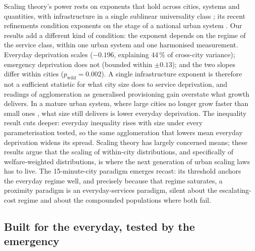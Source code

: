 \documentclass[11pt]{article}
\newcommand{\pw}[1]{$p_{\mathrm{wild}} = #1$}
\begin{document}
Scaling theory's power rests on exponents that hold across cities, systems
and quantities, with infrastructure in a single sublinear universality
class \citep{bettencourt2007growth,bettencourt2013origins}; its recent
refinements condition exponents on the stage of a national urban system
\citep{musso2026cities}. Our results add a different kind of condition:
the exponent depends on the regime of the service class, within one urban
system and one harmonised measurement. Everyday deprivation scales
($-0.196$, explaining 44\,\% of cross-city variance); emergency deprivation
does not (bounded within $\pm 0.13$); and the two slopes differ within
cities (\pw{0.002}). A single infrastructure exponent is therefore not a
sufficient statistic for what city size does to service deprivation, and
readings of agglomeration as generalised provisioning gain overstate what
growth delivers. In a mature urban system, where large cities no longer
grow faster than small ones \citep{musso2026cities}, what size still
delivers is lower everyday deprivation. The inequality result cuts
deeper: everyday inequality rises with size under every parameterisation
tested, so the same agglomeration that lowers mean everyday deprivation
widens its spread. Scaling theory has largely concerned means; these
results argue that the scaling of within-city distributions, and
specifically of welfare-weighted distributions, is where the next
generation of urban scaling laws has to live. The 15-minute-city paradigm
\citep{moreno2021fifteenminute,allam2022fifteenminute} emerges recast: its
threshold anchors the everyday regime well, and precisely because that
regime saturates, a proximity paradigm is an everyday-services paradigm,
silent about the escalating-cost regime and about the compounded
populations where both fail.

\subsection{Built for the everyday, tested by the emergency}\label{sec:theory-resilience}
\end{document}
